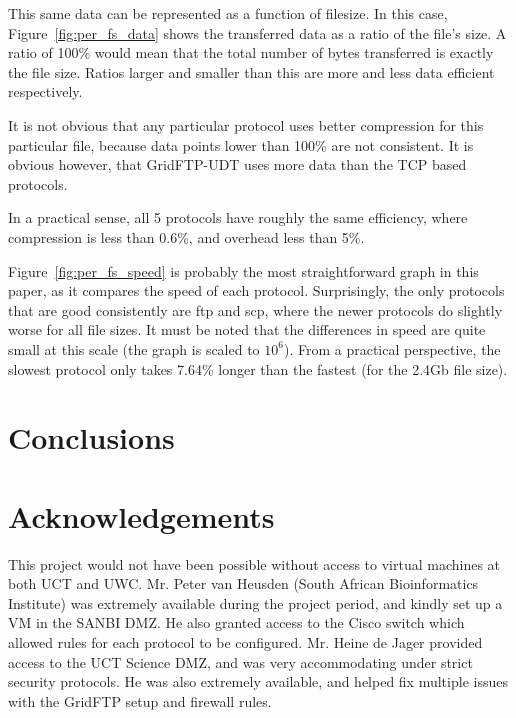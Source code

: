 \documentclass{sig-alternate-05-2015}
\begin{document}
This same data can be represented as a function of filesize. In this case, Figure~\ref{fig:per_fs_data} shows the transferred data as a ratio of the file's size. A ratio of 100\% would mean that the total number of bytes transferred is exactly the file size. Ratios larger and smaller than this are more and less data efficient respectively.

It is not obvious that any particular protocol uses better compression for this particular file, because data points lower than 100\% are not consistent. It is obvious however, that GridFTP-UDT uses more data than the TCP based protocols.

In a practical sense, all 5 protocols have roughly the same efficiency, where compression is less than 0.6\%, and overhead less than 5\%.

Figure~\ref{fig:per_fs_speed} is probably the most straightforward graph in this paper, as it compares the speed of each protocol. Surprisingly, the only protocols that are good consistently are ftp and scp, where the newer protocols do slightly worse for all file sizes. It must be noted that the differences in speed are quite small at this scale (the graph is scaled to $10^6$). From a practical perspective, the slowest protocol only takes 7.64\% longer than the fastest (for the 2.4Gb file size).

\section{Conclusions}

\section{Acknowledgements}
This project would not have been possible without access to virtual machines at both UCT and UWC. Mr. Peter van Heusden (South African Bioinformatics Institute) was extremely available during the project period, and kindly set up a VM in the SANBI DMZ. He also granted access to the Cisco switch which allowed rules for each protocol to be configured. Mr. Heine de Jager provided access to the UCT Science DMZ, and was very accommodating under strict security protocols. He was also extremely available, and helped fix multiple issues with the GridFTP setup and firewall rules.



\end{document}
